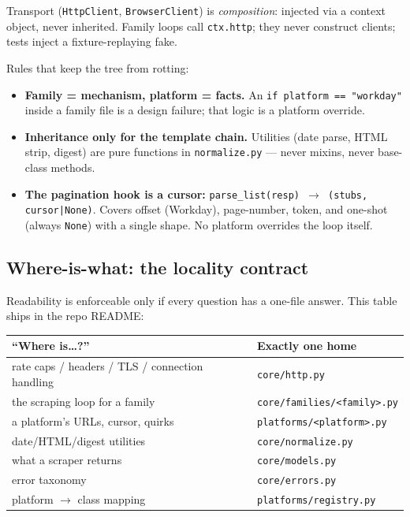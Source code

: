 \documentclass[11pt,a4paper]{article}
\newcommand{\law}[1]{\textbf{\textcolor{blue!50!black}{#1}}}
\begin{document}
Transport (\texttt{HttpClient}, \texttt{BrowserClient}) is \emph{composition}: injected via a context
object, never inherited. Family loops call \texttt{ctx.http}; they never construct clients; tests inject a
fixture-replaying fake.

Rules that keep the tree from rotting:
\begin{itemize}
\item \law{Family = mechanism, platform = facts.} An \texttt{if platform == "workday"} inside a family file
is a design failure; that logic is a platform override.
\item \law{Inheritance only for the template chain.} Utilities (date parse, HTML strip, digest) are pure
functions in \texttt{normalize.py} --- never mixins, never base-class methods.
\item \law{The pagination hook is a cursor:} \texttt{parse\_list(resp) $\rightarrow$ (stubs, cursor|None)}.
Covers offset (Workday), page-number, token, and one-shot (always \texttt{None}) with a single shape. No
platform overrides the loop itself.
\end{itemize}

\subsection{Where-is-what: the locality contract}
\label{sec:whereis}
Readability is enforceable only if every question has a one-file answer. This table ships in the repo README:

\begin{center}
\begin{tabular}{@{}ll@{}}
\toprule
``Where is\ldots?'' & Exactly one home \\
\midrule
rate caps / headers / TLS / connection handling & \texttt{core/http.py} \\
the scraping loop for a family & \texttt{core/families/<family>.py} \\
a platform's URLs, cursor, quirks & \texttt{platforms/<platform>.py} \\
date/HTML/digest utilities & \texttt{core/normalize.py} \\
what a scraper returns & \texttt{core/models.py} \\
error taxonomy & \texttt{core/errors.py} \\
platform $\rightarrow$ class mapping & \texttt{platforms/registry.py} \\
\bottomrule
\end{tabular}
\end{center}
\end{document}
